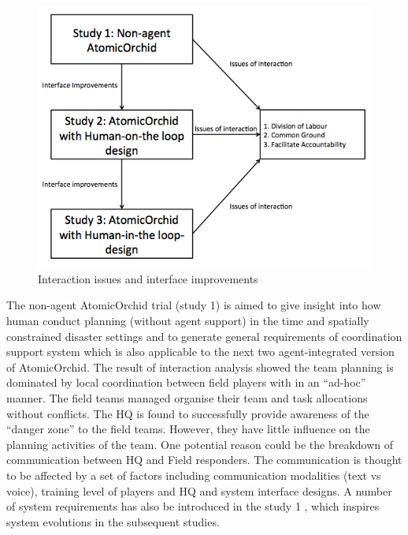 \begin{figure}[h]
  \centering
  \includegraphics[width=1\textwidth]{img/conclusion/connections}
  \caption{ Interaction issues and interface improvements}
  \label{fig:connections}
\end{figure}

The non-agent AtomicOrchid trial (study 1) is aimed to give insight into how human conduct planning (without agent support) in the time and spatially constrained disaster settings and to generate general requirements of coordination support system which is also applicable to the next two agent-integrated version of AtomicOrchid. The result of interaction analysis showed the team planning is dominated by local coordination between field players with in an ``ad-hoc'' manner. The field teams managed organise their team and task allocations without conflicts. The HQ is found to successfully provide awareness of the ``danger zone'' to the field teams. However, they have little influence on the planning activities of the team. One potential reason could be the breakdown of communication between HQ and Field responders. The communication is thought to be affected by a set of factors including communication modalities (text vs voice), training level of players and HQ and system interface designs. A number of system requirements has also be introduced in the study 1 , which inspires system evolutions in the subsequent studies. \\


